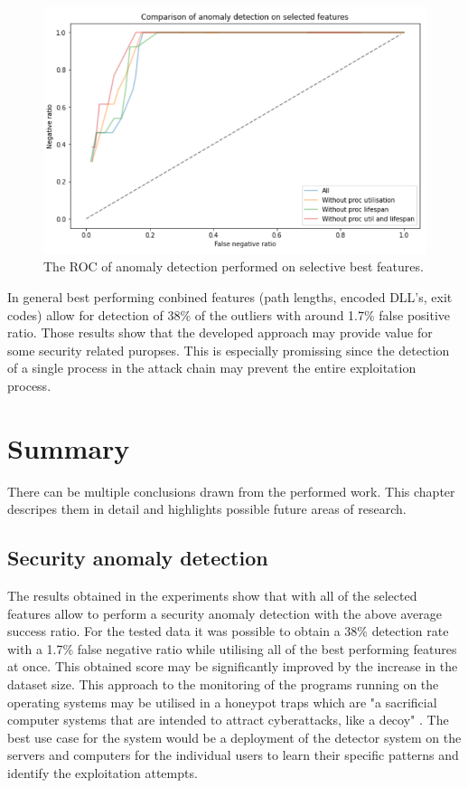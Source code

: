 \documentclass[a4paper,twoside,12pt]{book}
\begin{document}
\begin{figure}
	\centering
	\includegraphics[scale=0.9]{images/CombinedFinalROCDroping2}
	\caption{The ROC of anomaly detection performed on selective best features.}
	\label{fig:combinedCompFinalROCDroping}
 \end{figure}

In general best performing conbined features (path lengths, encoded DLL's, exit codes) allow for detection of 38\% of the 
outliers with around 1.7\% false positive ratio. Those results show that the developed approach may provide value for some 
security related puropses. This is especially promissing since the detection of a single process in the attack chain may 
prevent the entire exploitation process.

\chapter{Summary}


There can be multiple conclusions drawn from the performed work. This chapter descripes them in 
detail and highlights possible future areas of research.

\section{Security anomaly detection}

The results obtained in the experiments show that with all of the selected features allow 
to perform a security anomaly detection with the above average success ratio. For the tested
data it was possible to obtain a 38\% detection rate with a 1.7\% false negative ratio while
utilising all of the best performing features at once. This obtained score may be significantly 
improved by the increase in the dataset size. This approach to the monitoring of the programs 
running on the operating systems may be utilised in a honeypot traps which are "a sacrificial 
computer systems that are intended to attract cyberattacks, like a decoy" \cite{bib:Honeypot}. 
The best use case for the system would be a deployment of the detector system on the servers and 
computers for the individual users to learn their specific patterns and identify the exploitation
attempts.
\end{document}
